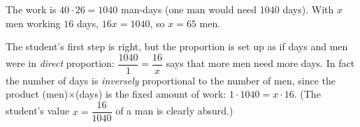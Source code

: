 The work is $40\cdot26=1040$ man-days (one man would need $1040$ days). With $x$ men working $16$ days, $16x=1040$, so $x=\boxed{65}$ men.

The student's first step is right, but the proportion is set up as if days and men were in \emph{direct} proportion: $\dfrac{1040}{1}=\dfrac{16}{x}$ says that more men need more days. In fact the number of days is \emph{inversely} proportional to the number of men, since the product (men)$\times$(days) is the fixed amount of work: $1\cdot1040=x\cdot16$. (The student's value $x=\dfrac{16}{1040}$ of a man is clearly absurd.)
